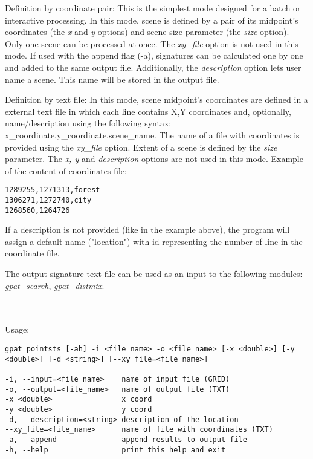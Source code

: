 Definition by coordinate pair: 
This is the simplest mode designed for a batch or interactive processing. 
In this mode, scene is defined by a pair of its midpoint's coordinates (the {\it x} and {\it y} options) and scene size parameter (the {\it size} option). 
Only one scene can be processed at once. 
The {\it xy\_file} option is not used in this mode.
If used with the append flag (-a), signatures can be calculated one by one and added to the same output file. 
Additionally, the {\it description} option lets user name a scene. 
This name will be stored in the output file.

Definition by text file:
In this mode, scene midpoint's coordinates are defined in a external text file in which each line contains X,Y coordinates and, optionally, name/description using the following syntax: x\_coordinate,y\_coordinate,scene\_name.
The name of a file with coordinates is provided using the {\it xy\_file} option. 
Extent of a scene is defined by the {\it size} parameter. 
The {\it x, y} and {\it description} options are not used in this mode. 
Example of the content of coordinates file: 

\begin{minipage}{\linewidth}
\begin{lstlisting}
1289255,1271313,forest
1306271,1272740,city
1268560,1264726
\end{lstlisting}
\end{minipage}

If a description is not provided (like in the example above), the program will assign a default name ("location") with id representing the number of line in the coordinate file.

The output signature text file can be used as an input to the following modules: {\it gpat\_search}, {\it gpat\_distmtx}.

{}
\\\\
Usage:

\begin{minipage}{\linewidth}
\begin{lstlisting}
gpat_pointsts [-ah] -i <file_name> -o <file_name> [-x <double>] [-y <double>] [-d <string>] [--xy_file=<file_name>]

-i, --input=<file_name>    name of input file (GRID)
-o, --output=<file_name>   name of output file (TXT)
-x <double>                x coord
-y <double>                y coord
-d, --description=<string> description of the location
--xy_file=<file_name>      name of file with coordinates (TXT)
-a, --append               append results to output file
-h, --help                 print this help and exit
\end{lstlisting}
\end{minipage}

